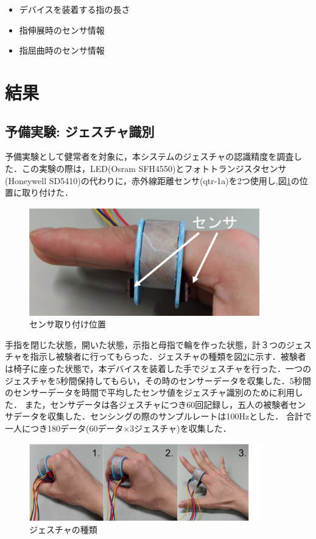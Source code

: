 \documentclass[11pt,a4paper]{jarticle}
\begin{document}
\begin{itemize}
 \item デバイスを装着する指の長さ
 \item 指伸展時のセンサ情報
 \item 指屈曲時のセンサ情報
\end{itemize}


\section{結果}
\subsection{予備実験: ジェスチャ識別}
予備実験として健常者を対象に，本システムのジェスチャの認識精度を調査した．この実験の際は，LED(Osram SFH4550)とフォトトランジスタセンサ(Honeywell SD5410)の代わりに，赤外線距離センサ(qtr-1a)を2つ使用し,図\ref{sensor}の位置に取り付けた．
\begin{figure}[H]
\begin{center}
\includegraphics[width=10cm]{fig/sens1.png}
\caption{センサ取り付け位置}
\label{sensor}
\end{center}
\end{figure}

手指を閉じた状態，開いた状態，示指と母指で輪を作った状態，計３つのジェスチャを指示し被験者に行ってもらった．ジェスチャの種類を図\ref{gesture}に示す．被験者は椅子に座った状態で，本デバイスを装着した手でジェスチャを行った．一つのジェスチャを5秒間保持してもらい，その時のセンサーデータを収集した．5秒間のセンサーデータを時間で平均したセンサ値をジェスチャ識別のために利用した．
また，センサデータは各ジェスチャにつき60回記録し，五人の被験者センサデータを収集した．センシングの際のサンプルレートは100Hzとした．
合計で一人につき180データ(60データ$\times$3ジェスチャ)を収集した．

\begin{figure}[H]
\begin{center}
\includegraphics[width=10cm]{fig/gesture.png}
\caption{ジェスチャの種類}
\label{gesture}
\end{center}
\end{figure}
\end{document}
